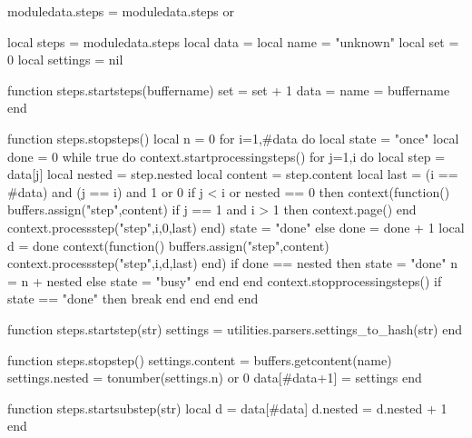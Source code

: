 


\unprotect

\startmode[screen] %

\startluacode

moduledata.steps = moduledata.steps or { }

local steps      = moduledata.steps
local data       = { }
local name       = "unknown"
local set        = 0
local settings   = nil

function steps.startsteps(buffername)
	set  = set + 1
	data = { }
	name = buffername
end

function steps.stopsteps()
	local n = 0
	for i=1,#data do
	local state = "once"
	local done  = 0
	while true do
		context.startprocessingsteps()
		for j=1,i do
			local step    = data[j]
			local nested  = step.nested
			local content = step.content
			local last    = (i == #data) and (j == i) and 1 or 0
			if j < i or nested == 0 then
				context(function()
					buffers.assign("step",content)
					if j == 1 and i > 1 then 
					context.page()
					end
					context.processstep("step",i,0,last)
				end)
				state = "done"
				else
					done = done + 1
					local d = done
					context(function()
						buffers.assign("step",content)
						context.processstep("step",i,d,last)
					end)
				if done == nested then
					state = "done"
					n = n + nested
				else
					state = "busy"
				end
				end
			end
			context.stopprocessingsteps()
			if state == "done" then
				break
			end
		end
	end
end

function steps.startstep(str)
	settings = utilities.parsers.settings_to_hash(str)
end

function steps.stopstep()
	settings.content = buffers.getcontent(name)
	settings.nested  = tonumber(settings.n) or 0
	data[#data+1] = settings
end

function steps.startsubstep(str)
	local d = data[#data]
	d.nested = d.nested + 1
end


